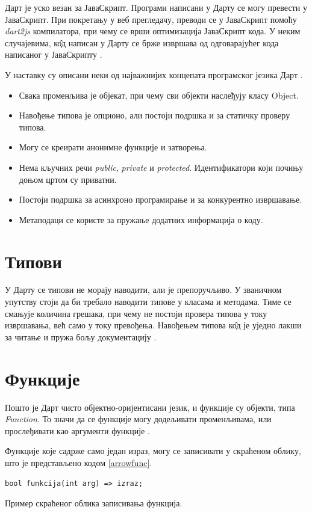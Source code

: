 \documentclass[12pt,oneside]{memoir}
\begin{document}
Дарт је уско везан за ЈаваСкрипт. Програми написани у Дарту се могу превести у ЈаваСкрипт. При покретању у веб прегледачу, преводи се у ЈаваСкрипт помоћу \textit{dart2js} компилатора, при чему се врши оптимизација ЈаваСкрипт кода. У неким случајевима, к\^{о}д написан у Дарту се брже извршава од одговарајућег кода написаног у ЈаваСкрипту \cite{dart, dart1}.

У наставку су описани неки од најважнијих концепата програмског језика Дарт \cite{dart, dart1}.
\begin{itemize}
\item Свака променљива је објекат, при чему сви објекти наслеђују класу Object.
\item Навођење типова је опционо, али постоји подршка и за статичку проверу типова.
\item Могу се креирати анонимне функције и затворења.
\item Нема кључних речи \textit{public}, \textit{private} и \textit{protected}. Идентификатори који почињу доњом цртом су приватни.
\item Постоји подршка за асинхроно програмирање и за конкурентно извршавање.
\item Метаподаци се користе за пружање додатних информација о коду.
\end{itemize}

\section{Типови}
\label{tipovi}

У Дарту се типови не морају наводити, али је препоручљиво. У званичном упутству стоји да би требало наводити типове у класама и методама. Тиме се смањује количина грешака, при чему не постоји провера типова у току извршавања, већ само у току превођења. Навођењем типова к\^{о}д је уједно лакши за читање и пружа бољу документацију \cite{dart, dart1}. 

\section{Функције}
\label{funkcije}
Пошто је Дарт чисто објектно-оријентисани језик, и функције су објекти, типа \textit{Function}. То значи да се функције могу додељивати променљивама, или прослеђивати као аргументи функције \cite{dart, dart1}.

Функције које садрже само један израз, могу се записивати у скраћеном облику, што је представљено кодом \ref{arrowfunc}. 
\begin{listing}
\begin{verbatim}
bool funkcija(int arg) => izraz;
\end{verbatim}
\caption{Пример скраћеног облика записивања функција.}
\label{arrowfunc}
\end{listing}
\end{document}
